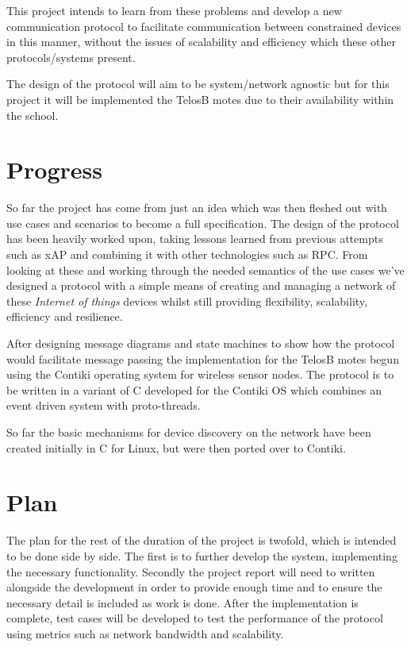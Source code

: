 \documentclass[a4paper,twocolumn]{article}
\begin{document}
This project intends to learn from these problems and develop a new communication protocol to facilitate communication between constrained devices in this manner, without the issues of scalability and efficiency which these other protocols/systems present.

The design of the protocol will aim to be system/network agnostic but for this project it will be implemented the TelosB motes due to their availability within the school.


\section{Progress} %
\label{sec:progress}
So far the project has come from just an idea which was then fleshed out with use cases and scenarios to become a full specification. The design of the protocol has been heavily worked upon, taking lessons learned from previous attempts such as xAP and combining it with other technologies such as RPC. From looking at these and working through the needed semantics of the use cases we've designed a protocol with a simple means of creating and managing a network of these \emph{Internet of things} devices whilst still providing flexibility, scalability, efficiency and resilience. 

After designing message diagrams and state machines to show how the protocol would facilitate message passing the implementation for the TelosB motes begun using the Contiki operating system for wireless sensor nodes. The protocol is to be written in a variant of C developed for the Contiki OS which combines an event driven system with proto-threads.

So far the basic mechanisms for device discovery on the network have been created initially in C for Linux, but were then ported over to Contiki. 

\section{Plan} %
\label{sec:plan}
The plan for the rest of the duration of the project is twofold, which is intended to be done side by side. The first is to further develop the system, implementing the necessary functionality. Secondly the project report will need to written alongside the development in order to provide enough time and to ensure the necessary detail is included as work is done.
After the implementation is complete, test cases will be developed to test the performance of the protocol using metrics such as network bandwidth and scalability. 
\end{document}
